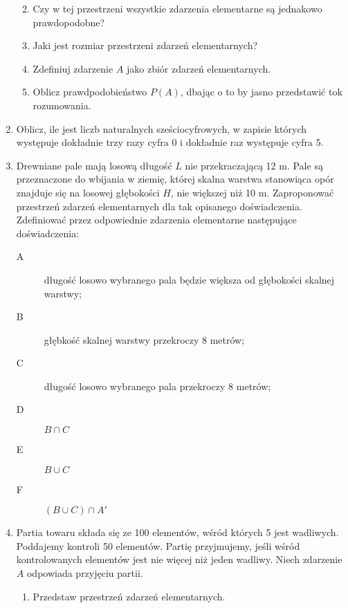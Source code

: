 \documentclass[twoside]{mwart}
\newcommand{\ans}[1]{}
\newenvironment{ansenv}{\comment}{\endcomment}
\newenvironment{ansenv}{\paragraph{Odpowiedź:}}{}
\newcommand{\ans}[1]{\begin{ansenv}#1\end{ansenv}}
\begin{document}
\begin{enumerate}
\begin{enumerate}
{}%
\item Czy w tej przestrzeni wszystkie zdarzenia elementarne są jednakowo prawdopodobne? \ans{Tak (zakładając, że klienci zamawiają dania niezależnie od siebie i }%
\item Jaki jest rozmiar przestrzeni zdarzeń elementarnych? \ans{$\left|\Omega\right|=6^5$}%
\item Zdefiniuj zdarzenie $A$ jako zbiór zdarzeń elementarnych. \ans{$A=\{(i_1,\ldots,i_5)|\exists j: i_j=1 \land \forall k\neq j: i_k\neq 1\}$, $\left|A\right|=5\cdot5^4$}%
\item Oblicz prawdpodobieństwo $P(A)$, dbając o to by jasno przedstawić tok rozumowania. \ans{$P(A)=\frac{5^5}{6^5}=\frac{5}{6}^5\approx 0{,}40$}%
\end{enumerate}%
\item Oblicz, ile jest liczb naturalnych sześciocyfrowych, w zapisie których występuje dokładnie trzy razy cyfra 0 i dokładnie raz występuje cyfra 5. %
\item  Drewniane pale mają losową długość $L$ nie przekraczającą 12 m. Pale są przeznaczone do wbijania w ziemię, której skalna warstwa stanowiąca opór znajduje się na losowej głębokości $H$, nie większej niż 10 m. Zaproponować przestrzeń zdarzeń elementarnych dla tak opisanego doświadczenia. Zdefiniować przez odpowiednie zdarzenia elementarne następujące doświadczenia:
\begin{description}
\item[A] długość losowo wybranego pala będzie większa od głębokości skalnej warstwy;
\item[B] głębkość skalnej warstwy przekroczy 8 metrów;
\item[C] długość losowo wybranego pala przekroczy 8 metrów;
\item[D] $B\cap C$
\item[E] $B\cup C$
\item[F] $(B\cup C)\cap A'$
\end{description}
\item Partia towaru składa się ze 100 elementów, wśród których 5 jest wadliwych. Poddajemy kontroli 50 elementów. Partię przyjmujemy, jeśli wśród kontrolowanych elementów jest nie więcej niż jeden wadliwy. Niech zdarzenie $A$ odpowiada przyjęciu partii.
\begin{enumerate}%
\item Przedstaw przestrzeń zdarzeń elementarnych. \ans{$\Omega=\{\omega_J|\left|J\right|=50 \land J\subset\{1,2,\ldots,100\}\}$}%

\end{enumerate}
\end{enumerate}
\end{document}
